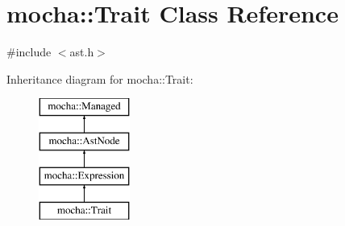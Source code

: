 \hypertarget{classmocha_1_1_trait}{
\section{mocha::Trait Class Reference}
\label{classmocha_1_1_trait}
}


{\ttfamily \#include $<$ast.h$>$}

Inheritance diagram for mocha::Trait:\begin{figure}[H]
\begin{center}
\leavevmode
\includegraphics[height=4.000000cm]{classmocha_1_1_trait}
\end{center}
\end{figure}
